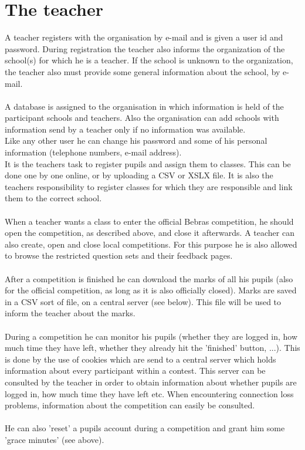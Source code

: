 \section{The teacher}

A teacher registers with the organisation by e-mail and is given a user id and password. During
registration the teacher also informs the organization of the school(s) for which he is a teacher. If the school is unknown to the organization, the teacher also must provide some general information about the school, by e-mail. \\
\\
A database is assigned to the organisation in which information is held of the participant schools and teachers. Also the organisation can add schools with information send by a teacher only if no information was available. \\
Like any other user he can change his password and some of his personal information (telephone numbers, e-mail address).\\
It is the teachers task to register pupils and assign them to classes. This can be done one by one online, or by uploading a CSV or XSLX file. It is also the teachers responsibility to register classes for which they are responsible and link them to the correct school.\\
\\
When a teacher wants a class to enter the official Bebras competition, he should open the competition, as described above, and close it afterwards. A teacher can also create, open and close local competitions. For this purpose he is also allowed to browse the restricted question sets and their feedback pages.\\
\\
After a competition is finished he can download the marks of all his pupils (also for the official competition, as long as it is also officially closed). Marks are saved in a CSV sort of file, on a central server (see below). This file will be used to inform the teacher about the marks.\\
\\
During a competition he can monitor his pupils (whether they are logged in, how much time they have left, whether they already hit the 'finished' button, ...). This is done by the use of cookies which are send to a central server which holds information about every participant within a contest. This server can be consulted by the teacher in order to obtain information about whether pupils are logged in, how much time they have left etc. When encountering connection loss problems, information about the competition can easily be consulted.  \\
\\
He can also 'reset' a pupils account during a competition and grant him some 'grace minutes' (see above).